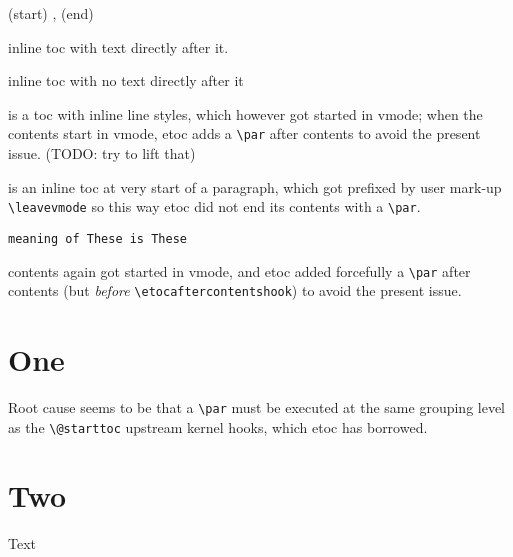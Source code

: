 \documentclass{article}
\begin{document}
  {(start) }
  {\etocname, }
  {}
  {(end) }%

\tableofcontents %

\etocinline
\etocsettocstyle{}{}

\bigskip
inline toc \tableofcontents with text directly after it.

\bigskip

inline toc with no text directly after it \tableofcontents

\bigskip

\tableofcontents is a toc with inline line styles, which however got started
in vmode; when the contents start in vmode, etoc adds a \verb|\par| after
contents to avoid the present issue. (TODO: try to lift that)

\bigskip

\leavevmode
\tableofcontents is an inline toc at very start of a paragraph, which got
prefixed by user mark-up \verb|\leavevmode| so this way etoc did not end its
contents with a \verb|\par|.


\bigskip


\def\etocaftercontentshook{These }

\texttt{meaning of \string\etocaftercontentshook is \meaning\etocaftercontentshook}

\tableofcontents contents again got started in vmode, and etoc added
forcefully a \verb|\par| after contents (but \emph{before}
\verb|\etocaftercontentshook|) to avoid the present issue.

\bigskip

\section{One}

Root cause seems to be that a \verb|\par| must be executed at the same
grouping level as the \verb|\@starttoc| upstream kernel hooks, which etoc has
borrowed.

\section{Two}

Text
\end{document}
